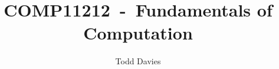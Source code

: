 \newcommand{\coursename}{Fundamentals of Computation}
\newcommand{\coursecode}{COMP11212}
\newcommand{\courseinfo}{}
\newcommand{\Author}{Todd Davies} 
\newcommand{\Title}{\coursecode~-~\coursename}
\author{\Author}
\title{\Title}
